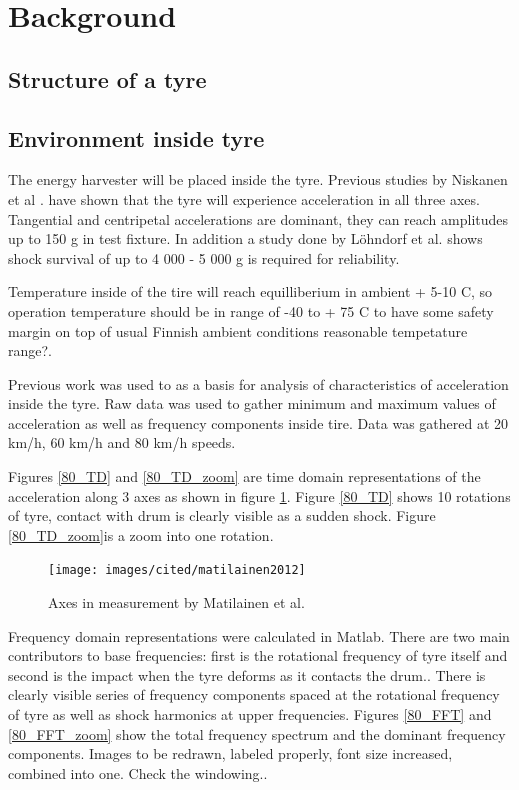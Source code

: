 \section{Background}

\subsection{Structure of a tyre}

\subsection{Environment inside tyre}
The energy harvester will be placed inside the tyre. Previous studies by Niskanen et al \cite{Niskanen2014}. have shown that the tyre will experience acceleration in all three axes. Tangential and centripetal accelerations are dominant, they can reach amplitudes up to 150 g in test fixture. In addition a study done by Löhndorf et al. \cite{Lohndorf2007} shows shock survival of up to 4 000 - 5 000 g is required for reliability. 

Temperature inside of the tire will reach equilliberium in ambient + 5-10 \degree C, so operation temperature should be in range of -40 to + 75 \degree C to have some safety margin on top of usual Finnish ambient conditions {\color{red} reasonable tempetature range?}.

Previous work \cite{Niskanen2014} was used to as a basis for analysis of characteristics of acceleration inside the tyre. Raw data was used to gather minimum and maximum values of acceleration as well as frequency components inside tire. Data was gathered at 20 km/h, 60 km/h and 80 km/h speeds. 

Figures \ref{80_TD} and \ref{80_TD_zoom} are time domain representations of the acceleration along 3 axes as shown in figure \ref{tyre_axes}. Figure \ref{80_TD} shows 10 rotations of tyre, contact with drum is clearly visible as a sudden shock. Figure \ref{80_TD_zoom}is a zoom into one rotation.

\begin{figure}[htb]
\begin{center}
\texttt{[image: images/cited/matilainen2012]}
\end{center}
\caption{Axes in measurement by Matilainen et al. \cite{Matilainen2012}}
\label{tyre_axes}
\end{figure}

Frequency domain representations were calculated in Matlab. There are two main contributors to base frequencies: first is the rotational frequency of tyre itself and second is the impact when the tyre deforms as it contacts the drum.. There is clearly visible series of frequency components spaced at the rotational frequency of tyre as well as shock harmonics at upper frequencies. Figures \ref{80_FFT} and \ref{80_FFT_zoom} show the total frequency spectrum and the dominant frequency components. {\color{red} Images to be redrawn, labeled properly, font size increased, combined into one. Check the windowing.}.

